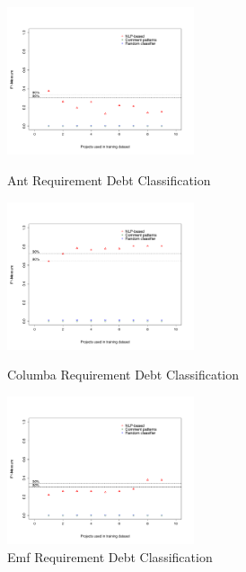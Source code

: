 \begin{figure}[thb!]    
  \centering
  \includegraphics[width=0.49\textwidth]{figures/appendix/iteration_details/implementation_ant.pdf}
  \caption{Ant Requirement Debt Classification}
  \label{fig:implementation_ant}
  \includegraphics[width=0.49\textwidth]{figures/appendix/iteration_details/implementation_columba.pdf}
  \caption{Columba Requirement Debt Classification}
  \label{fig:implementation_columba}
  \includegraphics[width=0.49\textwidth]{figures/appendix/iteration_details/implementation_emf.pdf}
  \caption{Emf Requirement Debt Classification}
  \label{fig:implementation_emf}
\end{figure}

